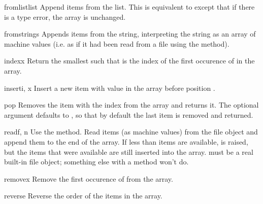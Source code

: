 \begin{methoddesc}[array]{fromlist}{list}
Append items from the list.  This is equivalent to
except that if there is a type error, the array is unchanged.
\end{methoddesc}

\begin{methoddesc}[array]{fromstring}{s}
Appends items from the string, interpreting the string as an
array of machine values (i.e. as if it had been read from a
file using the  method).
\end{methoddesc}

\begin{methoddesc}[array]{index}{x}
Return the smallest  such that  is the index of
the first occurence of  in the array.
\end{methoddesc}

\begin{methoddesc}[array]{insert}{i, x}
Insert a new item with value  in the array before position
.
\end{methoddesc}

\begin{methoddesc}[array]{pop}{}
Removes the item with the index  from the array and returns
it. The optional argument defaults to , so that by default
the last item is removed and returned. 
\end{methoddesc}

\begin{methoddesc}[array]{read}{f, n}
  {Use the  method.}
Read  items (as machine values) from the file object 
and append them to the end of the array.  If less than  items
are available,  is raised, but the items that were
available are still inserted into the array.   must be a real
built-in file object; something else with a  method won't
do.
\end{methoddesc}

\begin{methoddesc}[array]{remove}{x}
Remove the first occurence of  from the array.
\end{methoddesc}

\begin{methoddesc}[array]{reverse}{}
Reverse the order of the items in the array.
\end{methoddesc}

